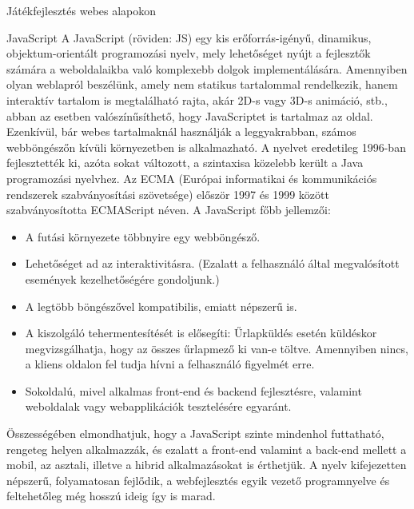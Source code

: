 \begin{MyChapter}{Játékfejlesztés webes alapokon}
	\begin{MySection}{JavaScript}
		A JavaScript (röviden: JS) egy kis erőforrás-igényű, dinamikus, objektum-orientált programozási nyelv, mely lehetőséget nyújt a fejlesztők számára a weboldalaikba való komplexebb dolgok implementálására. Amennyiben olyan weblapról beszélünk, amely nem statikus tartalommal rendelkezik, hanem interaktív tartalom is megtalálható rajta, akár 2D-s vagy 3D-s animáció, stb., abban az esetben valószínűsíthető, hogy JavaScriptet is tartalmaz az oldal. Ezenkívül, bár webes tartalmaknál használják a leggyakrabban, számos webböngészőn kívüli környezetben is alkalmazható. A nyelvet eredetileg 1996-ban fejlesztették ki, azóta sokat változott, a szintaxisa közelebb került a Java programozási nyelvhez. Az ECMA (Európai informatikai és kommunikációs rendszerek szabványosítási szövetsége) először 1997 és 1999 között szabványosította ECMAScript néven.
		A JavaScript főbb jellemzői:
		\begin{itemize}
			\item A futási környezete többnyire egy webböngésző.
			\item Lehetőséget ad az interaktivitásra. (Ezalatt a felhasználó által megvalósított események kezelhetőségére gondoljunk.)
			\item A legtöbb böngészővel kompatibilis, emiatt népszerű is.
			\item A kiszolgáló tehermentesítését is elősegíti: Űrlapküldés esetén küldéskor megvizsgálhatja, hogy az összes űrlapmező ki van-e töltve. Amennyiben nincs, a kliens oldalon fel tudja hívni a felhasználó figyelmét erre.
			\item Sokoldalú, mivel alkalmas front-end és backend fejlesztésre, valamint weboldalak vagy webapplikációk tesztelésére egyaránt.
		\end{itemize}
		Összességében elmondhatjuk, hogy a JavaScript szinte mindenhol futtatható, rengeteg helyen alkalmazzák, és ezalatt a front-end valamint a back-end mellett a mobil, az asztali, illetve a hibrid alkalmazásokat is érthetjük. A nyelv kifejezetten népszerű, folyamatosan fejlődik, a webfejlesztés egyik vezető programnyelve és feltehetőleg még hosszú ideig így is marad.
	\end{MySection}


\end{MyChapter}

